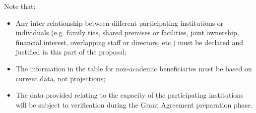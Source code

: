 Note that:
\begin{itemize}
\item Any inter-relationship between different participating institutions or individuals (e.g. family ties, shared premises or facilities, joint ownership, financial interest, overlapping staff or directors, etc.) must be declared and justified in this part of the proposal;
\item The information in the table for non-academic beneficiaries must be based on current data, not projections;
\item The data provided relating to the capacity of the participating institutions will be subject to verification during the Grant Agreement preparation phase.
\end{itemize}
